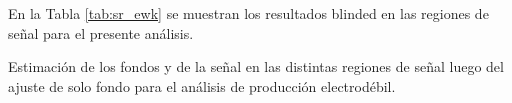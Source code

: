 En la Tabla \ref{tab:sr_ewk} se muestran los resultados blinded en las regiones de señal para el presente análisis. 


\begin{table}[ht!]
  \centering
  \caption{Estimación de los fondos y de la señal en las distintas regiones de señal luego del ajuste de solo fondo para el análisis de producción electrodébil.}
  \resizebox{\textwidth}{!}{}
  \label{tab:fit_result_sr}
\end{table}